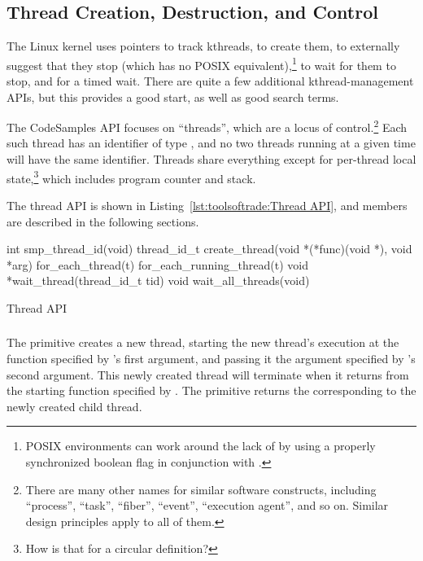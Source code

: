\subsection{Thread Creation, Destruction, and Control}
\label{sec:toolsoftrade:Thread Creation, Destruction, and Control}

The Linux kernel uses
 pointers to track kthreads,
 to create them,
 to externally suggest that they stop
(which has no POSIX equivalent),\footnote{
	POSIX environments can work around the lack of
	 by using a properly synchronized
	boolean flag in conjunction with .}
 to wait for them to stop, and
 for a timed wait.
There are quite a few additional kthread-management APIs, but this
provides a good start, as well as good search terms.

The CodeSamples API focuses on ``threads'', which are a locus of
control.\footnote{
	There are many other names for similar software constructs, including
	``process'', ``task'', ``fiber'', ``event'', ``execution agent'',
	and so on.
	Similar design principles apply to all of them.}
Each such thread has an identifier of type ,
and no two threads running at a given time will have the same
identifier.
Threads share everything except for per-thread local state,\footnote{
	How is that for a circular definition?}
which includes program counter and stack.

The thread API is shown in
Listing~\ref{lst:toolsoftrade:Thread API}, and members are described in the
following sections.

\begin{listing}[tbp]
\begin{VerbatimL}[numbers=none,xleftmargin=2pt]
int smp_thread_id(void)
thread_id_t create_thread(void *(*func)(void *), void *arg)
for_each_thread(t)
for_each_running_thread(t)
void *wait_thread(thread_id_t tid)
void wait_all_threads(void)
\end{VerbatimL}
\caption{Thread API}
\label{lst:toolsoftrade:Thread API}
\end{listing}

\subsubsection{}

The  primitive creates a new thread,
starting the new thread's execution
at the function  specified by 's
first argument, and passing it the argument specified by
's second argument.
This newly created thread will terminate when it returns from the
starting function specified by .
The  primitive returns the 
corresponding to the newly created child thread.

